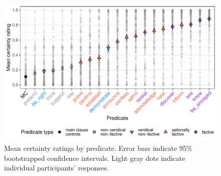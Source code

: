 \documentclass[11pt,fleqn]{article}
\newcommand{\6}{\mbox{$[\hspace*{-.6mm}[$}}
\newcommand{\9}{\mbox{$]\hspace*{-.6mm}]$}}
\begin{document}
\begin{figure}[H]
\centering

\includegraphics[width=.7\paperwidth]{../../results/5-projectivity-no-fact/graphs/means-projectivity-by-predicate-variability}

\caption{Mean certainty ratings by predicate. Error bars indicate 95\% bootstrapped confidence intervals. Light gray dots indicate individual participants' responses.} %
\label{f-projectivity}
\end{figure}




\end{document}
